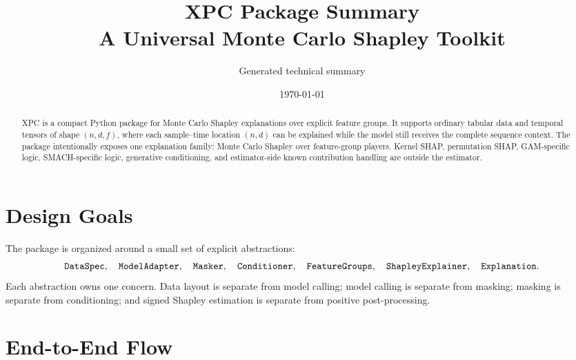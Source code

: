 \documentclass[11pt]{article}
\title{XPC Package Summary\\A Universal Monte Carlo Shapley Toolkit}
\author{Generated technical summary}
\date{\today}
\newcommand{\code}[1]{\texttt{#1}}
\newcommand{\shape}[1]{\ensuremath{\left(#1\right)}}
\begin{document}
\maketitle

\begin{abstract}
XPC is a compact Python package for Monte Carlo Shapley explanations over
explicit feature groups.  It supports ordinary tabular data and temporal tensors
of shape \(\shape{n,d,f}\), where each sample--time location \((n,d)\) can be
explained while the model still receives the complete sequence context.  The
package intentionally exposes one explanation family: Monte Carlo Shapley over
feature-group players.  Kernel SHAP, permutation SHAP, GAM-specific logic,
SMACH-specific logic, generative conditioning, and estimator-side known
contribution handling are outside the estimator.
\end{abstract}

\section{Design Goals}

The package is organized around a small set of explicit abstractions:
\[
\text{\code{DataSpec}},\quad
\text{\code{ModelAdapter}},\quad
\text{\code{Masker}},\quad
\text{\code{Conditioner}},\quad
\text{\code{FeatureGroups}},\quad
\text{\code{ShapleyExplainer}},\quad
\text{\code{Explanation}}.
\]
Each abstraction owns one concern.  Data layout is separate from model calling;
model calling is separate from masking; masking is separate from conditioning;
and signed Shapley estimation is separate from positive post-processing.

\section{End-to-End Flow}
\end{document}
